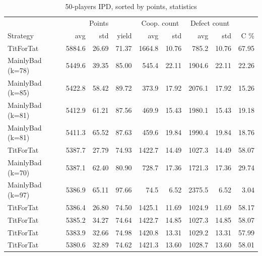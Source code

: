 \documentclass[journal,a4paper,10pt,twoside]{IEEEtran} %
\begin{document}
\begin{table}[ht]
	\caption{50-players IPD, sorted by points, statistics}
	\label{tab:ipdmp50}
	\centering
	\begin{tabular}{l|rrr|rrrrr} \toprule
		                  & \multicolumn{3}{c}{Points} & \multicolumn{2}{c}{Coop. count} & \multicolumn{2}{c}{Defect count} &        \\
		Strategy          &    avg &   std &     yield &    avg &                    std &    avg &                     std &   C \% \\ \midrule
		TitForTat         & 5884.6 & 26.69 &     71.37 & 1664.8 &                  10.76 &  785.2 &                   10.76 &  67.95 \\
		MainlyBad (k=78)  & 5449.6 & 39.35 &     85.00 &  545.4 &                  22.11 & 1904.6 &                   22.11 &  22.26 \\
		MainlyBad (k=85)  & 5422.8 & 58.42 &     89.72 &  373.9 &                  17.92 & 2076.1 &                   17.92 &  15.26 \\
		MainlyBad (k=81)  & 5412.9 & 61.21 &     87.56 &  469.9 &                  15.43 & 1980.1 &                   15.43 &  19.18 \\
		MainlyBad (k=81)  & 5411.3 & 65.52 &     87.63 &  459.6 &                  19.84 & 1990.4 &                   19.84 &  18.76 \\
		TitForTat         & 5387.7 & 27.79 &     74.93 & 1422.7 &                  14.49 & 1027.3 &                   14.49 &  58.07 \\
		MainlyBad (k=70)  & 5387.1 & 62.40 &     80.90 &  728.7 &                  17.36 & 1721.3 &                   17.36 &  29.74 \\
		MainlyBad (k=97)  & 5386.9 & 65.11 &     97.66 &   74.5 &                   6.52 & 2375.5 &                    6.52 &   3.04 \\
		TitForTat         & 5386.4 & 26.80 &     74.50 & 1425.1 &                  11.69 & 1024.9 &                   11.69 &  58.17 \\
		TitForTat         & 5385.2 & 34.27 &     74.64 & 1422.7 &                  14.85 & 1027.3 &                   14.85 &  58.07 \\
		TitForTat         & 5383.9 & 32.66 &     74.98 & 1420.8 &                  13.31 & 1029.2 &                   13.31 &  57.99 \\
		TitForTat         & 5380.6 & 32.89 &     74.62 & 1421.3 &                  13.60 & 1028.7 &                   13.60 &  58.01 \\

\end{tabular}
\end{table}
\end{document}
